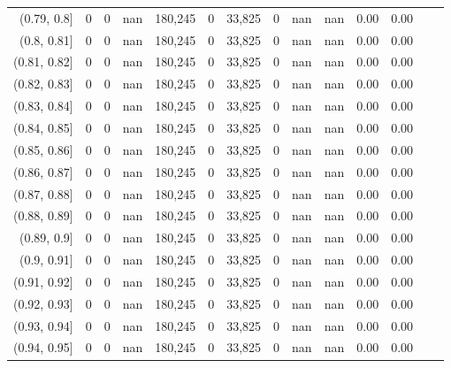 \begin{tabular}{rrrrrrrrrrrrrr}
(0.79, 0.8]    &       0 &      0 &     nan &  180,245 &        0 &  33,825 &       0 &   nan &   nan &  0.00 &      0.00 \\
(0.8, 0.81]    &       0 &      0 &     nan &  180,245 &        0 &  33,825 &       0 &   nan &   nan &  0.00 &      0.00 \\
(0.81, 0.82]   &       0 &      0 &     nan &  180,245 &        0 &  33,825 &       0 &   nan &   nan &  0.00 &      0.00 \\
(0.82, 0.83]   &       0 &      0 &     nan &  180,245 &        0 &  33,825 &       0 &   nan &   nan &  0.00 &      0.00 \\
(0.83, 0.84]   &       0 &      0 &     nan &  180,245 &        0 &  33,825 &       0 &   nan &   nan &  0.00 &      0.00 \\
(0.84, 0.85]   &       0 &      0 &     nan &  180,245 &        0 &  33,825 &       0 &   nan &   nan &  0.00 &      0.00 \\
(0.85, 0.86]   &       0 &      0 &     nan &  180,245 &        0 &  33,825 &       0 &   nan &   nan &  0.00 &      0.00 \\
(0.86, 0.87]   &       0 &      0 &     nan &  180,245 &        0 &  33,825 &       0 &   nan &   nan &  0.00 &      0.00 \\
(0.87, 0.88]   &       0 &      0 &     nan &  180,245 &        0 &  33,825 &       0 &   nan &   nan &  0.00 &      0.00 \\
(0.88, 0.89]   &       0 &      0 &     nan &  180,245 &        0 &  33,825 &       0 &   nan &   nan &  0.00 &      0.00 \\
(0.89, 0.9]    &       0 &      0 &     nan &  180,245 &        0 &  33,825 &       0 &   nan &   nan &  0.00 &      0.00 \\
(0.9, 0.91]    &       0 &      0 &     nan &  180,245 &        0 &  33,825 &       0 &   nan &   nan &  0.00 &      0.00 \\
(0.91, 0.92]   &       0 &      0 &     nan &  180,245 &        0 &  33,825 &       0 &   nan &   nan &  0.00 &      0.00 \\
(0.92, 0.93]   &       0 &      0 &     nan &  180,245 &        0 &  33,825 &       0 &   nan &   nan &  0.00 &      0.00 \\
(0.93, 0.94]   &       0 &      0 &     nan &  180,245 &        0 &  33,825 &       0 &   nan &   nan &  0.00 &      0.00 \\
(0.94, 0.95]   &       0 &      0 &     nan &  180,245 &        0 &  33,825 &       0 &   nan &   nan &  0.00 &      0.00 \\

\end{tabular}
